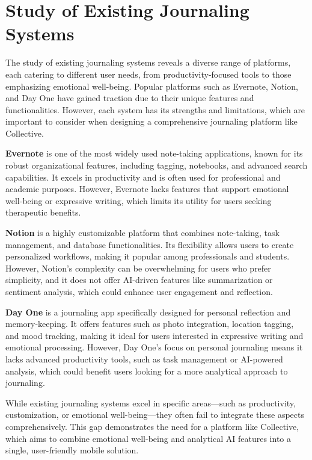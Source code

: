 \section{Study of Existing Journaling Systems}\label{sec:existing-systems}

The study of existing journaling systems reveals a diverse range of platforms, each catering to different user needs, from productivity-focused tools to those emphasizing emotional well-being. Popular platforms such as Evernote, Notion, and Day One have gained traction due to their unique features and functionalities. However, each system has its strengths and limitations, which are important to consider when designing a comprehensive journaling platform like Collective.

\textbf{Evernote} is one of the most widely used note-taking applications, known for its robust organizational features, including tagging, notebooks, and advanced search capabilities. It excels in productivity and is often used for professional and academic purposes. However, Evernote lacks features that support emotional well-being or expressive writing, which limits its utility for users seeking therapeutic benefits.

\textbf{Notion} is a highly customizable platform that combines note-taking, task management, and database functionalities. Its flexibility allows users to create personalized workflows, making it popular among professionals and students. However, Notion's complexity can be overwhelming for users who prefer simplicity, and it does not offer AI-driven features like summarization or sentiment analysis, which could enhance user engagement and reflection.

\textbf{Day One} is a journaling app specifically designed for personal reflection and memory-keeping. It offers features such as photo integration, location tagging, and mood tracking, making it ideal for users interested in expressive writing and emotional processing. However, Day One's focus on personal journaling means it lacks advanced productivity tools, such as task management or AI-powered analysis, which could benefit users looking for a more analytical approach to journaling.

While existing journaling systems excel in specific areas—such as productivity, customization, or emotional well-being—they often fail to integrate these aspects comprehensively. This gap demonstrates the need for a platform like Collective, which aims to combine emotional well-being and analytical AI features into a single, user-friendly mobile solution.

